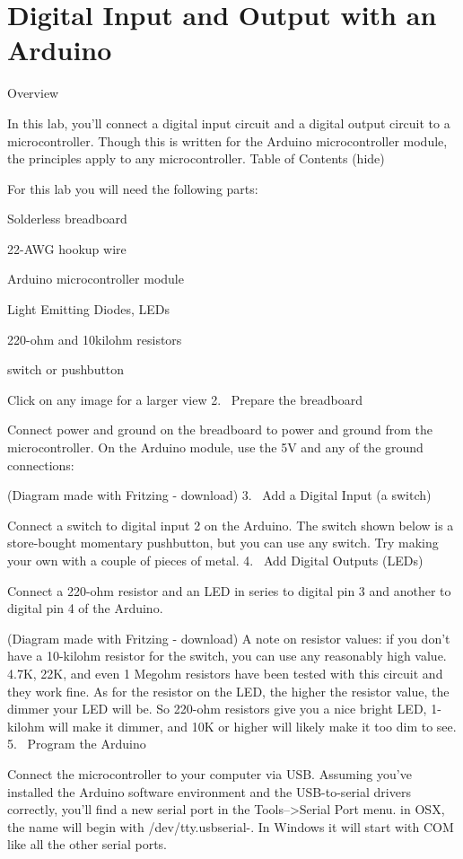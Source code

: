 \chapter{Digital Input and Output with an Arduino}

Overview

In this lab, you'll connect a digital input circuit and a digital output circuit to a microcontroller. Though this is written for the Arduino microcontroller module, the principles apply to any microcontroller.
Table of Contents (hide)

For this lab you will need the following parts:

Solderless breadboard

22-AWG hookup wire

Arduino microcontroller module


Light Emitting Diodes, LEDs

220-ohm and 10kilohm resistors

switch or pushbutton

Click on any image for a larger view
2.  Prepare the breadboard

Connect power and ground on the breadboard to power and ground from the microcontroller. On the Arduino module, use the 5V and any of the ground connections:

(Diagram made with Fritzing - download)
3.  Add a Digital Input (a switch)

Connect a switch to digital input 2 on the Arduino. The switch shown below is a store-bought momentary pushbutton, but you can use any switch. Try making your own with a couple of pieces of metal.
4.  Add Digital Outputs (LEDs)

Connect a 220-ohm resistor and an LED in series to digital pin 3 and another to digital pin 4 of the Arduino.
 
(Diagram made with Fritzing - download)
A note on resistor values: if you don't have a 10-kilohm resistor for the switch, you can use any reasonably high value. 4.7K, 22K, and even 1 Megohm resistors have been tested with this circuit and they work fine. As for the resistor on the LED, the higher the resistor value, the dimmer your LED will be. So 220-ohm resistors give you a nice bright LED, 1-kilohm will make it dimmer, and 10K or higher will likely make it too dim to see.
5.  Program the Arduino

Connect the microcontroller to your computer via USB. Assuming you've installed the Arduino software environment and the USB-to-serial drivers correctly, you'll find a new serial port in the Tools-->Serial Port menu. in OSX, the name will begin with /dev/tty.usbserial-. In Windows it will start with COM like all the other serial ports.

